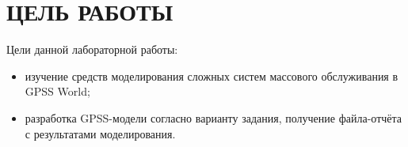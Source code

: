 \section{ЦЕЛЬ РАБОТЫ}

Цели данной лабораторной работы:

\begin{itemize}

\item
  изучение средств моделирования сложных систем массового 
  обслуживания в GPSS World;
\item
  разработка GPSS-модели согласно варианту задания, 
  получение файла-отчёта с результатами моделирования.

\end{itemize}
